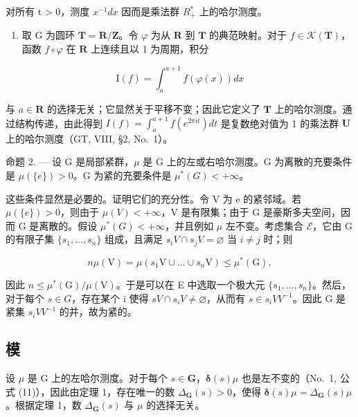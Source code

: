 对所有 t \textgreater{} 0，测度 \(x^{-1} dx\) 因而是乘法群 \(R_{+}^{*}\) 上的哈尔测度。

\begin{enumerate}
\def\labelenumi{\arabic{enumi})}
\setcounter{enumi}{2}
\tightlist
\item
  取 G 为圆环 \(\mathbf{T} = \mathbf{R} / \mathbf{Z}\)。令 \(\varphi\) 为从 \(\mathbf{R}\) 到 \(\mathbf{T}\) 的典范映射。对于 \(f \in \mathcal{K}(\mathbf{T})\)，函数 \(f \circ \varphi\) 在 \(\mathbf{R}\) 上连续且以 1 为周期，积分
\end{enumerate}

\[
\mathrm{I} (f) = \int_ {a} ^ {a + 1} f (\varphi (x)) d x
\]

与 \(a \in \mathbf{R}\) 的选择无关；它显然关于平移不变；因此它定义了 \(\mathbf{T}\) 上的哈尔测度。通过结构传递，由此得到 \(I(f) = \int_{a}^{a + 1} f(e^{2\pi it}) dt\) 是复数绝对值为 1 的乘法群 \(\mathbf{U}\) 上的哈尔测度（GT, VIII, §2, No.~1）。

命题 2. --- 设 G 是局部紧群，\(\mu\) 是 G 上的左或右哈尔测度。G 为离散的充要条件是 \(\mu(\{e\}) > 0\)。G 为紧的充要条件是 \(\mu^{*}(G) < +\infty\)。

这些条件显然是必要的。证明它们的充分性。令 V 为 e 的紧邻域。若 \(\mu(\{e\}) > 0\)，则由于 \(\mu(V) < +\infty\)，V 是有限集；由于 G 是豪斯多夫空间，因而 G 是离散的。假设 \(\mu^{*}(G)<+\infty\)，并且例如 \(\mu\) 左不变。考虑集合 \(\mathscr{E}\)，它由 G 的有限子集 \(\{s_{1},\ldots,s_{n}\}\) 组成，且满足 \(s_{i}V\cap s_{j}V=\varnothing\) 当 \(i\neq j\) 时；则

\[
n \mu (\mathrm{V}) = \mu (s _ {1} \mathrm{V} \cup \dots \cup s _ {n} \mathrm{V}) \leqslant \mu^ {*} (\mathrm{G}),
\]

因此 \(n \leqslant \mu^{*}(\mathrm{G})/\mu(\mathrm{V})\)。于是可以在 E 中选取一个极大元 \(\{s_{1},\ldots,s_{n}\}\)。然后，对于每个 \(s \in G\)，存在某个 i 使得 \(sV \cap s_{i}V \neq \varnothing\)，从而有 \(s \in s_{i}VV^{-1}\)。因此 G 是紧集 \(s_{i}VV^{-1}\) 的并，故为紧的。

\subsection{模}

设 \(\mu\) 是 G 上的左哈尔测度。对于每个 \(s \in \mathbf{G}\)，\(\pmb{\delta}(s)\mu\) 也是左不变的（No.~1, 公式 (11)），因此由定理 1，存在唯一的数 \(\Delta_{\mathbf{G}}(s) > 0\)，使得 \(\pmb{\delta}(s)\mu = \Delta_{\mathbf{G}}(s)\mu\)。根据定理 1，数 \(\Delta_{\mathbf{G}}(s)\) 与 \(\mu\) 的选择无关。

